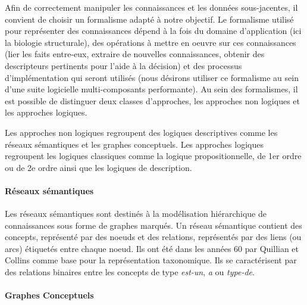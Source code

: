 Afin de correctement manipuler les connaissances et les données sous-jacentes, il convient de choisir un formalisme adapté à notre objectif. Le formalisme utilisé pour représenter des connaissances dépend à la fois du domaine d'application (ici la biologie structurale), des opérations à mettre en oeuvre sur ces connaissances (lier les faits entre-eux, extraire de nouvelles connaissances, obtenir des descripteurs pertinents pour l'aide à la décision) et des processus d'implémentation qui seront utilisés (nous désirons utiliser ce formalisme au sein d'une suite logicielle multi-composants performante). Au sein des formalismes, il est possible de distinguer deux classes d'approches, les approches non logiques et les approches logiques.

Les approches non logiques regroupent des logiques descriptives comme les réseaux sémantiques et les graphes conceptuels.
Les approches logiques regroupent les logiques classiques comme la logique propositionnelle, de 1er ordre ou de 2e ordre ainsi que les logiques de description.

\paragraph{Réseaux sémantiques}

Les réseaux sémantiques sont destinés à la modélisation hiérarchique de connaissances sous forme de graphes marqués. Un réseau sémantique contient des concepts, représenté par des noeuds et des relations, représentés par des liens (ou arcs) étiquetés entre chaque noeud. Ils ont été dans les années 60 par Quillian et Collins \cite{collins1969retrieval} comme base pour la représentation taxonomique. Ils se caractérisent par des relations binaires entre les concepts de type \textit{est-un}, \textit{a} ou \textit{type-de}.

\paragraph{Graphes Conceptuels}

